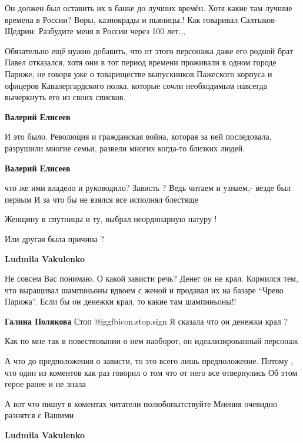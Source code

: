 \begin{itemize}
\begin{itemize}
Он должен был оставить их в банке до лучших времён.
Хотя какие там лучшие времена в России?
Воры, казнокрады и пьяницы.!
Как говаривал Салтыков-Щедрин: Разбудите меня в России через 100 лет..,

\end{itemize} %


Обязательно ещё нужно добавить, что от этого персонажа даже его родной брат
Павел отказался, хотя они в тот период времени проживали в одном городе Париже,
не говоря уже о товариществе выпускников Пажеского корпуса и офицеров
Кавалергардского полка, которые сочли необходимым навсегда вычеркнуть его из
своих списков.

\begin{itemize} %
\textbf{Валерий Елисеев} 

И это было. Революция и гражданская война, которая за ней последовала,
разрушили многие семьи, развели многих когда-то близких людей.

\textbf{Валерий Елисеев} 

что же ими владело и руководило? Зависть ? Ведь читаем и узнаем,- везде был
первым И за что бы не взялся все исполнял блестяще

Женщину в спутницы и ту, выбрал неординарную натуру !

Или другая была причина ?

\begin{itemize} %
\textbf{Ludmila Vakulenko} 

Не совсем Вас понимаю. О какой зависти речь? Денег он не крал. Кормился тем,
что выращивал шампиньоны вдвоем с женой и продавал их на базаре \enquote{Чрево Парижа}.
Если бы он денежки крал, то какие там шампиньоны!!

\textbf{Галина Полякова} Стоп  @igg{fbicon.stop.sign} 
Я сказала что он денежки крал ?

Как по мне так в повествовании о нем наоборот, он идеализированный персонаж

А что до предположения о зависти, то это всего лишь предположение. Потому , что
один из коментов как раз говорил о том что от него все отвернулись Об этом
герое ранее и не знала

А вот что пишут в коментах читатели полюбопытствуйте Мнения очевидно разнятся с
Вашими

\textbf{Ludmila Vakulenko} 


\end{itemize}
\end{itemize}
\end{itemize}
